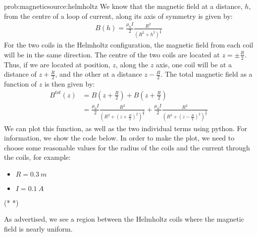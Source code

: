 \begin{solution}{prob:magneticsource:helmholtz}\label{soln:magneticsource:helmholtz}
We know that the magnetic field at a distance, $h$, from the centre of a loop of current, along its axis of symmetry is given by:
\begin{align*}
 B(h) = \frac{\mu_0 I}{2}\frac{R^2}{(R^2+h^2)^{\frac{3}{2}}}
\end{align*}
For the two coils in the Helmholtz configuration, the magnetic field from each coil will be in the same direction. The centre of the two coils are located at $z=\pm\frac{R}{2}$. Thus, if we are located at position, $z$, along the $z$ axis, one coil will be at a distance of $z+\frac{R}{2}$, and the other at a distance $z-\frac{R}{2}$. The total magnetic field as a function of $z$ is then given by:
\begin{align*}
B^{tot}(z) &= B\left(z+\frac{R}{2}\right)+B\left(z+\frac{R}{2}\right)\\
&=\frac{\mu_0 I}{2}\frac{R^2}{(R^2+\left(z+\frac{R}{2}\right)^2)^{\frac{3}{2}}}+\frac{\mu_0 I}{2}\frac{R^2}{(R^2+\left(z-\frac{R}{2}\right)^2)^{\frac{3}{2}}}
\end{align*}
We can plot this function, as well as the two individual terms using python. For information, we show the code below. In order to make the plot, we need to choose some reasonable values for the radius of the coils and the current through the coils, for example:
\begin{itemize}
\item $R=\SI{0.3}{m}$
\item $I=\SI{0.1}{A}$
\end{itemize}
	
\begin{poutput}
	(*  *)
\end{poutput}
As advertised, we see a region between the Helmholtz coils where the magnetic field is nearly uniform. 
\end{solution}

